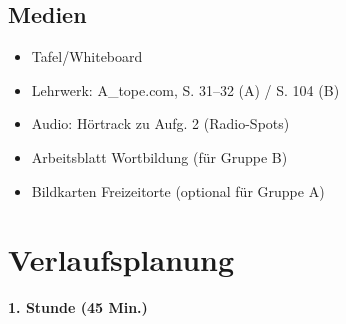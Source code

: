 \documentclass[11pt,a4paper]{article}
\begin{document}
\subsection{Medien}
\begin{itemize}
    \item Tafel/Whiteboard
    \item Lehrwerk: A\_tope.com, S. 31--32 (A) / S. 104 (B)
    \item Audio: Hörtrack zu Aufg. 2 (Radio-Spots)
    \item Arbeitsblatt Wortbildung (für Gruppe B)
    \item Bildkarten Freizeitorte (optional für Gruppe A)
\end{itemize}

\section{Verlaufsplanung}

\textbf{1. Stunde (45 Min.)}
\end{document}
